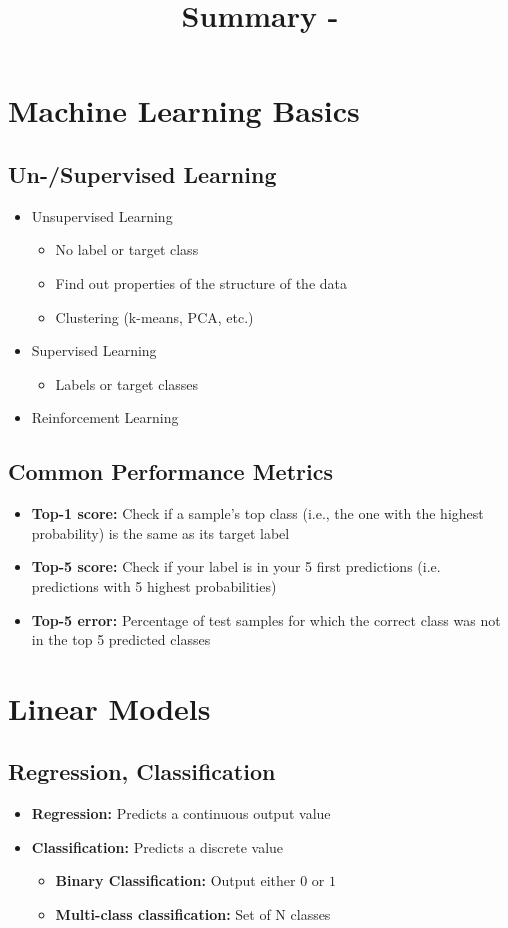 \documentclass[10pt,a4paper]{article}
\title{Summary - \lecture}
\author{}
\date{}
\begin{document}
\tableofcontents
\pagebreak

\section{Machine Learning Basics}
\subsection{Un-/Supervised Learning}
\begin{itemize}
	\item Unsupervised Learning
	\begin{itemize}
		\item No label or target class
		\item Find out properties of the structure of the data
		\item Clustering (k-means, PCA, etc.)
	\end{itemize}
	\item Supervised Learning
	\begin{itemize}
		\item Labels or target classes
	\end{itemize}
	\item Reinforcement Learning
\end{itemize}

\subsection{Common Performance Metrics}
\begin{itemize}
	\item \textbf{Top-1 score:} Check if a sample's top class (i.e., the one with the highest probability) is the same as its target label
	\item \textbf{Top-5 score:} Check if your label is in your 5 first predictions (i.e. predictions with 5 highest probabilities)
	\item \textbf{Top-5 error:} Percentage of test samples for which the correct class was not in the top 5 predicted classes
\end{itemize}

\pagebreak
\section{Linear Models}
\subsection{Regression, Classification}
\begin{itemize}
	\item \textbf{Regression:} Predicts a continuous output value
	\item \textbf{Classification:} Predicts a discrete value
	\begin{itemize}
		\item \textbf{Binary Classification:} Output either $0$ or $1$
		\item \textbf{Multi-class classification:} Set of N classes
	\end{itemize}
\end{itemize}
\end{document}
